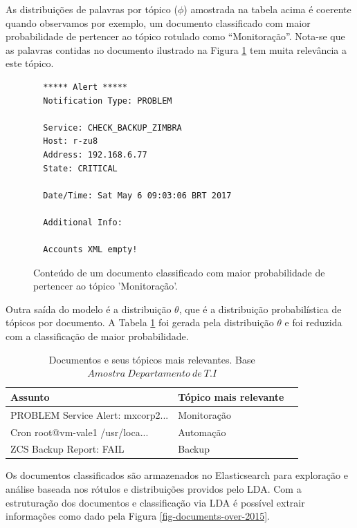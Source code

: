 \documentclass[12pt,a4paper]{article}
\begin{document}
As distribuições de palavras por tópico ($\phi$) amostrada na tabela acima é coerente quando observamos por exemplo, um documento classificado com maior
 probabilidade de pertencer ao tópico rotulado como ``Monitoração''. Nota-se que as palavras contidas no documento ilustrado na Figura \ref{mo} tem muita relevância a este tópico.


\begin{figure}[H]
  \scriptsize
  \begin{verbatim}
  ***** Alert *****
  Notification Type: PROBLEM

  Service: CHECK_BACKUP_ZIMBRA
  Host: r-zu8
  Address: 192.168.6.77
  State: CRITICAL

  Date/Time: Sat May 6 09:03:06 BRT 2017

  Additional Info:

  Accounts XML empty!
  \end{verbatim}
  \normalsize
  \caption{Conteúdo de um documento classificado com maior probabilidade de pertencer ao tópico 'Monitoração'.}
  \label{mo}
\end{figure}

Outra saída do modelo é a distribuição $\theta$, que é a distribuição probabilística de tópicos por documento. A Tabela \ref{tab-nich-documents2} foi gerada pela distribuição $\theta$ e foi reduzida com a classificação de maior 
 probabilidade.

\begin{table}[H]
  \centering
  \begin{tabular}{lll}
  Assunto                               & Tópico mais relevante \\
  \hline
  PROBLEM Service Alert: mxcorp2...     & Monitoração \\
  Cron root@vm-vale1 /usr/loca...       & Automação \\
  ZCS Backup Report: FAIL               & Backup \\
  \hline
  \end{tabular}
  \caption{Documentos e seus tópicos mais relevantes. Base $Amostra\ Departamento\ de\ T.I$}
  \label{tab-nich-documents2}
\end{table}



Os documentos classificados são armazenados no Elasticsearch para exploração e análise baseada 
 nos rótulos e distribuições providos pelo LDA. Com a estruturação dos documentos e classificação via LDA é possível extrair informações como 
 dado pela Figura \ref{fig-documents-over-2015}.
\end{document}
